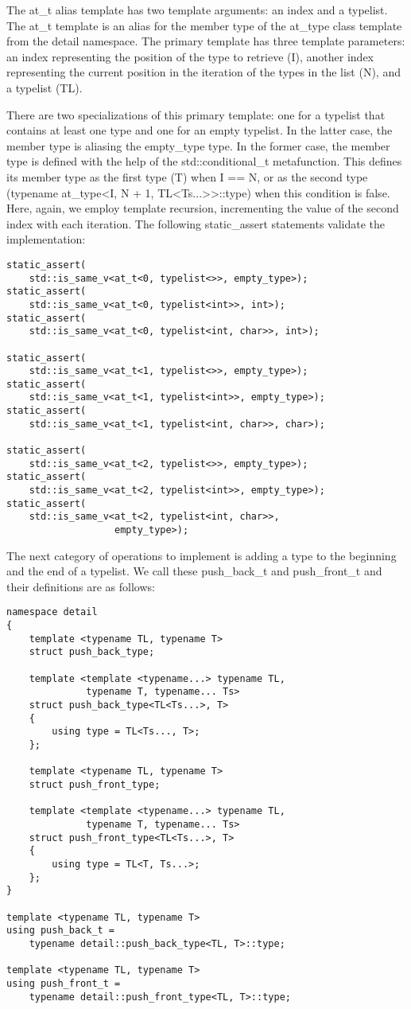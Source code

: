 The at\_t alias template has two template arguments: an index and a typelist. The at\_t template is an alias for the member type of the at\_type class template from the detail namespace. The primary template has three template parameters: an index representing the position of the type to retrieve (I), another index representing the current position in the iteration of the types in the list (N), and a typelist (TL).

There are two specializations of this primary template: one for a typelist that contains at least one type and one for an empty typelist. In the latter case, the member type is aliasing the empty\_type type. In the former case, the member type is defined with the help of the std::conditional\_t metafunction. This defines its member type as the first type (T) when I == N, or as the second type (typename at\_type<I, N + 1, TL<Ts...>{}>::type) when this condition is false. Here, again, we employ template recursion, incrementing the value of the second index with each iteration. The following static\_assert statements validate the implementation:

\begin{lstlisting}[style=styleCXX]
static_assert(
	std::is_same_v<at_t<0, typelist<>>, empty_type>);
static_assert(
	std::is_same_v<at_t<0, typelist<int>>, int>);
static_assert(
	std::is_same_v<at_t<0, typelist<int, char>>, int>);
	
static_assert(
	std::is_same_v<at_t<1, typelist<>>, empty_type>);
static_assert(
	std::is_same_v<at_t<1, typelist<int>>, empty_type>);
static_assert(
	std::is_same_v<at_t<1, typelist<int, char>>, char>);
	
static_assert(
	std::is_same_v<at_t<2, typelist<>>, empty_type>);
static_assert(
	std::is_same_v<at_t<2, typelist<int>>, empty_type>);
static_assert(
	std::is_same_v<at_t<2, typelist<int, char>>,
				   empty_type>);
\end{lstlisting}

The next category of operations to implement is adding a type to the beginning and the end of a typelist. We call these push\_back\_t and push\_front\_t and their definitions are as follows:

\begin{lstlisting}[style=styleCXX]
namespace detail
{
	template <typename TL, typename T>
	struct push_back_type;
	
	template <template <typename...> typename TL,
			  typename T, typename... Ts>
	struct push_back_type<TL<Ts...>, T>
	{
		using type = TL<Ts..., T>;
	};

	template <typename TL, typename T>
	struct push_front_type;
	
	template <template <typename...> typename TL,
			  typename T, typename... Ts>
	struct push_front_type<TL<Ts...>, T>
	{
		using type = TL<T, Ts...>;
	};
}

template <typename TL, typename T>
using push_back_t =
	typename detail::push_back_type<TL, T>::type;
	
template <typename TL, typename T>
using push_front_t =
	typename detail::push_front_type<TL, T>::type;
\end{lstlisting}

